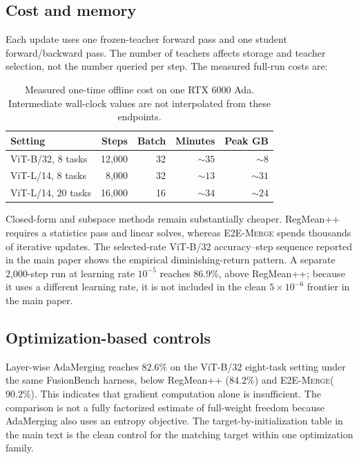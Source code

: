 \documentclass[letterpaper]{article} %
\newcommand{\method}{\textup{\textsc{E2E-Merge}}\xspace}
\theoremstyle{plain}
\theoremstyle{definition}
\begin{document}
\subsection{Cost and memory}
\label{app:cost}
Each update uses one frozen-teacher forward pass and one student forward/backward pass.
The number of teachers affects storage and teacher selection, not the number queried per step.
The measured full-run costs are:

\begin{table}[!ht]
\centering
{\small
\begin{tabular*}{\columnwidth}{@{\extracolsep{\fill}}lrrrr}
\toprule
Setting & Steps & Batch & Minutes & Peak GB \\
\midrule
ViT-B/32, 8 tasks & 12,000 & 32 & $\sim35$ & $\sim8$ \\
ViT-L/14, 8 tasks & 8,000 & 32 & $\sim13$ & $\sim31$ \\
ViT-L/14, 20 tasks & 16,000 & 16 & $\sim34$ & $\sim24$ \\
\bottomrule
\end{tabular*}
}
\caption{Measured one-time offline cost on one RTX 6000 Ada. Intermediate
wall-clock values are not interpolated from these endpoints.}
\label{tab:cost-app}
\end{table}

Closed-form and subspace methods remain substantially cheaper.
RegMean++ requires a statistics pass and linear solves, whereas \method spends thousands of iterative updates.
The selected-rate ViT-B/32 accuracy--step sequence reported in the main paper shows the empirical diminishing-return pattern.
A separate 2,000-step run at learning rate $10^{-5}$ reaches $86.9\%$, above RegMean++; because it uses a different learning rate, it is not included in the clean $5\times10^{-6}$ frontier in the main paper.

\subsection{Optimization-based controls}
\label{app:optimization-controls}
Layer-wise AdaMerging reaches $82.6\%$ on the ViT-B/32 eight-task setting under the same FusionBench harness, below RegMean++ ($84.2\%$) and \method ($90.2\%$).
This indicates that gradient computation alone is insufficient.
The comparison is not a fully factorized estimate of full-weight freedom because AdaMerging also uses an entropy objective.
The target-by-initialization table in the main text is the clean control for the matching target within one optimization family.
\end{document}
